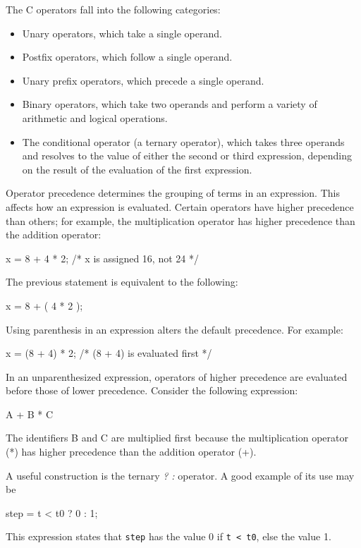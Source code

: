 The C operators fall into the following categories:

\begin{itemize} 
    \item Unary operators, which take a single operand.
    \item Postfix operators, which follow a single operand.
    \item Unary prefix operators, which precede a single operand.
    \item Binary operators, which take two operands and perform a
variety of arithmetic and logical operations.
    \item The conditional operator (a ternary operator), which takes
three operands and resolves to the value of either the second or third
expression, depending on the result of the evaluation of the first
expression.
\end{itemize}

Operator precedence determines the grouping of terms in an
expression. This affects how an expression is evaluated. Certain
operators have higher precedence than others; for example, the
multiplication operator has higher precedence than the addition
operator:

\begin{example}
x = 8 + 4 * 2;        /* x is assigned 16, not 24 */ 
\end{example}

The previous statement is equivalent to the following:

\begin{example}
x = 8 + ( 4 * 2 ); 
\end{example}

Using parenthesis in an expression alters the default precedence. For
example:

\begin{example}
x = (8 + 4) * 2;  /*  (8 + 4) is evaluated first    */ 
\end{example}

In an unparenthesized expression, operators of higher precedence are
evaluated before those of lower precedence. Consider the following
expression:

\begin{example}
A + B * C 
\end{example}

The identifiers B and C are multiplied first because the multiplication
operator (*) has higher precedence than the addition operator (+).

A useful construction is the ternary \emph{? :} operator. A good example
of its use may be      
\begin{example}
        step = t < t0 ? 0 : 1;
\end{example}
This expression states that \texttt{step} has the value 0 if \texttt{t <
t0}, else the value 1.

